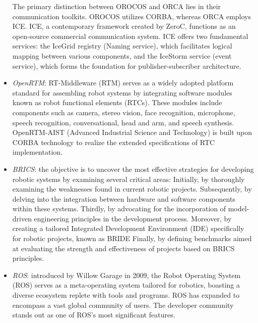 \begin{itemize}
        The primary distinction between OROCOS and ORCA lies in their communication toolkits. 
        OROCOS utilizes CORBA, whereas ORCA employs ICE.\@
        ICE, a contemporary framework created by ZeroC, functions as an open-source commercial communication system. 
        ICE offers two fundamental services: the IceGrid registry (Naming service), which facilitates logical mapping between various components, and the IceStorm service (event service), which forms the foundation for publisher-subscriber architecture.
    \item \textit{OpenRTM}: RT-Middleware (RTM) serves as a widely adopted platform standard for assembling robot systems by integrating software modules known as robot functional elements (RTCs). 
        These modules include components such as camera, stereo vision, face recognition, microphone, speech recognition, conversational, head and arm, and speech synthesis. 
        OpenRTM-AIST (Advanced Industrial Science and Technology) is built upon CORBA technology to realize the extended specifications of RTC implementation.
    \item \textit{BRICS}: the objective is to uncover the most effective strategies for developing robotic systems by examining several critical areas:
        Initially, by thoroughly examining the weaknesses found in current robotic projects.    
        Subsequently, by delving into the integration between hardware and software components within these systems.    
        Thirdly, by advocating for the incorporation of model-driven engineering principles in the development process.    
        Moreover, by creating a tailored Integrated Development Environment (IDE) specifically for robotic projects, known as BRIDE\@    
        Finally, by defining benchmarks aimed at evaluating the strength and effectiveness of projects based on BRICS principles.
    \item \textit{ROS}: introduced by Willow Garage in 2009, the Robot Operating System (ROS) serves as a meta-operating system tailored for robotics, boasting a diverse ecosystem replete with tools and programs.
        ROS has expanded to encompass a vast global community of users. 
        The developer community stands out as one of ROS's most significant features.
\end{itemize}  

